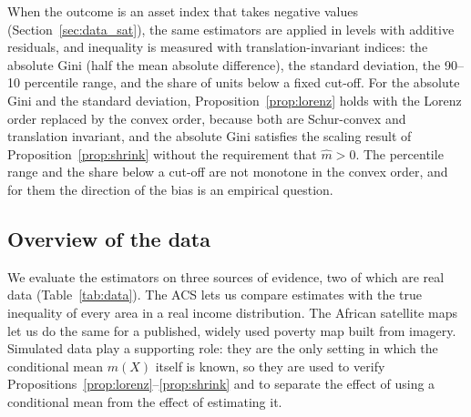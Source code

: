 \documentclass[pdflatex,sn-mathphys-ay]{sn-jnl}
\theoremstyle{thmstyleone}%
\theoremstyle{thmstyletwo}%
\theoremstyle{thmstylethree}%
\begin{document}
When the outcome is an asset index that takes negative values (Section~\ref{sec:data_sat}), the same estimators are applied in levels with additive residuals, and inequality is measured with translation-invariant indices: the absolute Gini (half the mean absolute difference), the standard deviation, the 90--10 percentile range, and the share of units below a fixed cut-off. For the absolute Gini and the standard deviation, Proposition~\ref{prop:lorenz} holds with the Lorenz order replaced by the convex order, because both are Schur-convex and translation invariant, and the absolute Gini satisfies the scaling result of Proposition~\ref{prop:shrink} without the requirement that $\hat m>0$. The percentile range and the share below a cut-off are not monotone in the convex order, and for them the direction of the bias is an empirical question.

\subsection{Overview of the data}\label{sec:data_overview}

We evaluate the estimators on three sources of evidence, two of which are real data (Table~\ref{tab:data}). The ACS lets us compare estimates with the true inequality of every area in a real income distribution. The African satellite maps let us do the same for a published, widely used poverty map built from imagery. Simulated data play a supporting role: they are the only setting in which the conditional mean $m(X)$ itself is known, so they are used to verify Propositions~\ref{prop:lorenz}--\ref{prop:shrink} and to separate the effect of using a conditional mean from the effect of estimating it.
\end{document}
